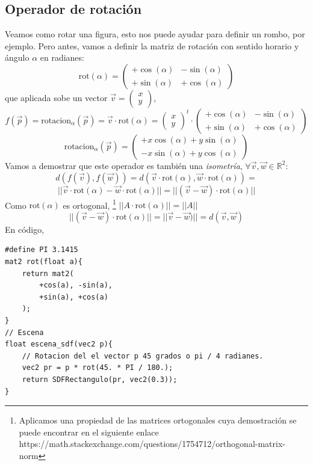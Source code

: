 \subsection{Operador de rotación}
Veamos como rotar una figura, esto nos puede ayudar para definir un rombo, por ejemplo. Pero antes, vamos a definir la matriz de rotación con sentido horario y ángulo \(\alpha\) en radianes:
\[ 
\text{rot}(\alpha)=\begin{pmatrix}
    +\cos(\alpha) & -\sin(\alpha)\\
    +\sin(\alpha) & +\cos(\alpha)
\end{pmatrix}
\]
que aplicada sobe un vector \(\Vec{v}=\begin{pmatrix}
    x\\
    y
\end{pmatrix}\),
\[ 
f(\Vec{p})=\text{rotacion}_\alpha(\Vec{p})=\Vec{v}\cdot\text{rot}(\alpha)=\begin{pmatrix}
    x\\
    y
\end{pmatrix}^t\cdot\begin{pmatrix}
    +\cos(\alpha) & -\sin(\alpha)\\
    +\sin(\alpha) & +\cos(\alpha)
\end{pmatrix}
\]
\[\text{rotacion}_\alpha(\Vec{p})=\begin{pmatrix}
    +x\cos(\alpha) + y\sin(\alpha)\\
    -x\sin(\alpha) + y\cos(\alpha)
\end{pmatrix}
\]
Vamos a demostrar que este operador es también una \textit{isometría}, \(\forall \Vec{v},\Vec{w}\in\mathbb{R}^2\):
\[d(f(\Vec{v}), f(\Vec{w}))=d(\Vec{v}\cdot \text{rot}(\alpha), \Vec{w}\cdot \text{rot}(\alpha))=\]\[\vert\vert \Vec{v}\cdot \text{rot}(\alpha)- \Vec{w}\cdot \text{rot}(\alpha)\vert\vert=\vert\vert(\Vec{v}-\Vec{w})\cdot \text{rot}(\alpha)\vert\vert\]
Como \(\text{rot}(\alpha)\) es ortogonal, 
\footnote{Aplicamos una propiedad de las matrices ortogonales cuya demostración se puede encontrar en el siguiente enlace https://math.stackexchange.com/questions/1754712/orthogonal-matrix-norm} \(\vert\vert A\cdot\text{rot}(\alpha)\vert\vert=\vert\vert A\vert\vert\)
\[\vert\vert(\Vec{v}-\Vec{w})\cdot \text{rot}(\alpha)\vert\vert=\vert\vert\Vec{v}-\Vec{w})\vert\vert=d(\Vec{v},\Vec{w})\]
En código,
\begin{lstlisting}
#define PI 3.1415
mat2 rot(float a){
    return mat2(
        +cos(a), -sin(a), 
        +sin(a), +cos(a)
    );
}
// Escena
float escena_sdf(vec2 p){
    // Rotacion del el vector p 45 grados o pi / 4 radianes.
    vec2 pr = p * rot(45. * PI / 180.);
    return SDFRectangulo(pr, vec2(0.3));
}
\end{lstlisting}


